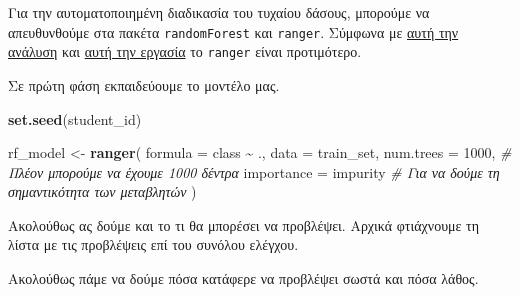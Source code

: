 \documentclass[
]{article}
\newenvironment{Shaded}{\begin{snugshade}}{\end{snugshade}}
\newcommand{\AttributeTok}[1]{\textcolor[rgb]{0.13,0.29,0.53}{#1}}
\newcommand{\CommentTok}[1]{\textcolor[rgb]{0.56,0.35,0.01}{\textit{#1}}}
\newcommand{\DecValTok}[1]{\textcolor[rgb]{0.00,0.00,0.81}{#1}}
\newcommand{\FunctionTok}[1]{\textcolor[rgb]{0.13,0.29,0.53}{\textbf{#1}}}
\newcommand{\NormalTok}[1]{#1}
\newcommand{\OtherTok}[1]{\textcolor[rgb]{0.56,0.35,0.01}{#1}}
\newcommand{\SpecialCharTok}[1]{\textcolor[rgb]{0.81,0.36,0.00}{\textbf{#1}}}
\newcommand{\StringTok}[1]{\textcolor[rgb]{0.31,0.60,0.02}{#1}}
\begin{document}
Για την αυτοματοποιημένη διαδικασία του τυχαίου δάσους, μπορούμε να
απευθυνθούμε στα πακέτα \texttt{randomForest} και \texttt{ranger}.
Σύμφωνα με
\href{https://www.css.cornell.edu/faculty/dgr2/_static/files/R_html/CompareRandomForestPackages.html}{αυτή
την ανάλυση} και \href{https://arxiv.org/pdf/1508.04409}{αυτή την
εργασία} το \texttt{ranger} είναι προτιμότερο.

Σε πρώτη φάση εκπαιδεύουμε το μοντέλο μας.

\begin{Shaded}
\begin{Highlighting}[]
\FunctionTok{set.seed}\NormalTok{(student\_id)}

\NormalTok{rf\_model }\OtherTok{\textless{}{-}} \FunctionTok{ranger}\NormalTok{(}
  \AttributeTok{formula =}\NormalTok{ class }\SpecialCharTok{\textasciitilde{}}\NormalTok{ ., }
  \AttributeTok{data    =}\NormalTok{ train\_set, }
  \AttributeTok{num.trees =} \DecValTok{1000}\NormalTok{, }\CommentTok{\# Πλέον μπορούμε να έχουμε 1000 δέντρα}
  \AttributeTok{importance =} \StringTok{\textquotesingle{}impurity\textquotesingle{}} \CommentTok{\# Για να δούμε τη σημαντικότητα των μεταβλητών}
\NormalTok{)}
\end{Highlighting}
\end{Shaded}

Ακολούθως ας δούμε και το τι θα μπορέσει να προβλέψει. Αρχικά φτιάχνουμε
τη λίστα με τις προβλέψεις επί του συνόλου ελέγχου.

\begin{Shaded}
\end{Shaded}

Ακολούθως πάμε να δούμε πόσα κατάφερε να προβλέψει σωστά και πόσα λάθος.

\begin{Shaded}
\end{Shaded}
\end{document}
